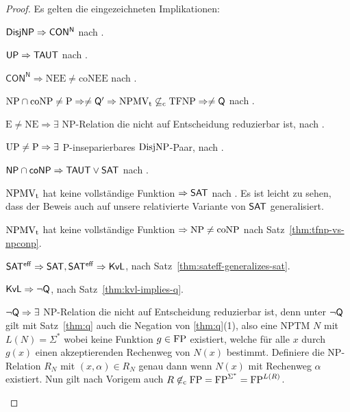 \begin{proof}
    Es gelten die eingezeichneten Implikationen:
    \begin{Prooflist}[nosep]
\item $\mathsf{DisjNP} \Rightarrow \mathsf{CON^N}$ nach \textcite{kobler_optimal_2003}.
\item $\mathsf{UP} \Rightarrow \mathsf{TAUT}$ nach \textcite{kobler_optimal_2003}. 
\item $\mathsf{CON^N}\Rightarrow \mathrm{NEE\neq coNEE}$ nach \textcite{kobler_optimal_2003}.
\item $\mathrm{NP}\cap\mathrm{coNP}\neq \mathrm{P} \Rightarrow \neq\mathsf{Q}' \Rightarrow \mathrm{NPMV_t} \not\subseteq_\mathrm{c} \mathrm{TFNP} \Rightarrow \neq\mathsf{Q}$ nach \textcite{fenner_inverting_2003}.
\item $\mathrm{E\neq NE}\Rightarrow \exists$ NP-Relation die nicht auf Entscheidung reduzierbar ist, nach \textcite{impagliazzo_1991}.
\item $\mathrm{UP}\neq\mathrm{P} \Rightarrow \exists$ P-inseparierbares $\mathrm{DisjNP}$-Paar, nach \textcite[Thm.~5]{grollmann_complexity_1988}.
\item $\mathsf{NP}{}\cap{}\mathsf{coNP}\Rightarrow \mathsf{TAUT}\lor\mathsf{SAT}$ nach \textcite[Cor.~24]{beyersdorff_nondeterministic_2009}. 
\item $\mathrm{NPMV_t}$ hat keine vollständige Funktion $\Rightarrow \mathsf{SAT}$ nach \textcite[Thm.~25]{beyersdorff_nondeterministic_2009}. Es ist leicht zu sehen, dass der Beweis auch auf unsere relativierte Variante von $\mathsf{SAT}$ generalisiert.
\item $\mathrm{NPMV_t}$ hat keine vollständige Funktion $\Rightarrow \mathrm{NP}\neq\mathrm{coNP}$ nach Satz~\ref{thm:tfnp-vs-npconp}.
\item $\mathsf{SAT^{eff}} \Rightarrow \mathsf{SAT}, \mathsf{SAT^{eff}}\Rightarrow \mathsf{KvL}$, nach Satz~\ref{thm:sateff-generalizes-sat}.
\item $\mathsf{KvL}\Rightarrow\neg\mathsf{Q}$, nach Satz~\ref{thm:kvl-implies-q}.
\item $\neg\mathsf{Q}\Rightarrow \exists$ NP-Relation die nicht auf Entscheidung reduzierbar ist, denn unter $\neg\mathsf{Q}$ gilt mit Satz~\ref{thm:q} auch die Negation von \ref{thm:q}(1), also eine NPTM $N$ mit $L(N)=\Sigma^*$ wobei keine Funktion $g\in\mathrm{FP}$ existiert, welche für alle $x$ durch $g(x)$ einen akzeptierenden Rechenweg von $N(x)$ bestimmt.
    Definiere die NP-Relation $R_N$ mit $(x,\alpha)\in R_N$ genau dann wenn $N(x)$ mit Rechenweg $\alpha$ existiert. Nun gilt nach Vorigem auch $R\not\in_\mathrm{c} \mathrm{FP}=\mathrm{FP}^{\Sigma^*} = \mathrm{FP}^{L(R)}$.

\end{Prooflist}
\end{proof}
